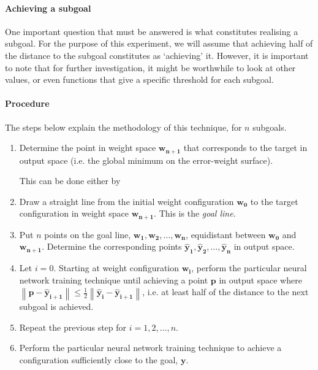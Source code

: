 \documentclass{article}
\renewcommand\vec{\mathbf}
\newcommand{\norm}[1]{\left\lVert#1\right\rVert}
\begin{document}
\paragraph{Achieving a subgoal}
One important question that must be answered is what constitutes realising a subgoal. 
For the purpose of this experiment, we will assume that achieving half of the distance to the subgoal constitutes as `achieving' it. 
However, it is important to note that for further investigation, it might be worthwhile to look at other values, or even functions that give a specific threshold for each subgoal.

\paragraph{Procedure}
The steps below explain the methodology of this technique, for $n$ subgoals.
\begin{enumerate}
    \item Determine the point in weight space $\vec{w_{n+1}}$ that corresponds to the target in output space (i.e. the global minimum on the error-weight surface). 
        
        This can be done either by
    
    \item Draw a straight line from the initial weight configuration $\vec{w_0}$ to the target configuration in weight space $\vec{w_{n+1}}$.
        This is the \textit{goal line}.
    
    \item Put $n$ points on the goal line, $\vec{w_1}, \vec{w_2}, \dots, \vec{w_n}$, equidistant between $\vec{w_0}$ and $\vec{w_{n+1}}$. 
        Determine the corresponding points $\vec{\hat{y}_1}, \vec{\hat{y}_2}, \dots, \vec{\hat{y}_n}$ in output space.
    \item Let $i=0$. Starting at weight configuration $\vec{w_i}$, perform the particular neural network training technique until achieving a point $\vec{p}$ in output space where $\norm{\vec{p} - \vec{\hat{y}_{i+1}}} \leq \frac{1}{2} \norm{\vec{\hat{y}_i} - \vec{\hat{y}_{i+1}}}$, i.e. at least half of the distance to the next subgoal is achieved.
    \item Repeat the previous step for $i=1, 2, \dots, n$.
    \item Perform the particular neural network training technique to achieve a configuration sufficiently close to the goal, $\vec{y}$. 
\end{enumerate}
\end{document}
